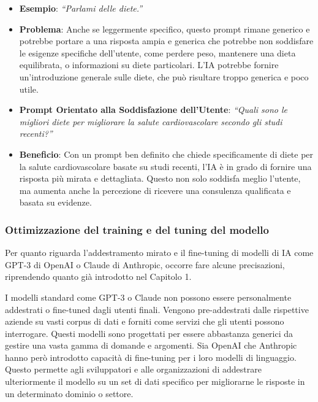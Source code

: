             \begin{itemize}
                \item \textbf{Esempio}: \textit{``Parlami delle diete.''}
                \item \textbf{Problema}: Anche se leggermente specifico, questo prompt rimane generico e potrebbe portare a una risposta ampia e generica che potrebbe non soddisfare le esigenze specifiche dell'utente, come perdere peso, mantenere una dieta equilibrata, o informazioni su diete particolari. L'IA potrebbe fornire un'introduzione generale sulle diete, che può risultare troppo generica e poco utile.
                \item \textbf{Prompt Orientato alla Soddisfazione dell'Utente}: \textit{``Quali sono le migliori diete per migliorare la salute cardiovascolare secondo gli studi recenti?''}
                \item \textbf{Beneficio}: Con un prompt ben definito che chiede specificamente di diete per la salute cardiovascolare basate su studi recenti, l'IA è in grado di fornire una risposta più mirata e dettagliata. Questo non solo soddisfa meglio l'utente, ma aumenta anche la percezione di ricevere una consulenza qualificata e basata su evidenze.
            \end{itemize}
            
        \subsubsection{Ottimizzazione del training e del tuning del modello}
            Per quanto riguarda l'addestramento mirato e il fine-tuning di modelli di IA come GPT-3 di OpenAI o Claude di Anthropic, occorre fare alcune precisazioni, riprendendo quanto già introdotto nel Capitolo 1.

            I modelli standard come GPT-3 o Claude non possono essere personalmente addestrati o fine-tuned dagli utenti finali. Vengono pre-addestrati dalle rispettive aziende su vasti corpus di dati e forniti come servizi che gli utenti possono interrogare. Questi modelli sono progettati per essere abbastanza generici da gestire una vasta gamma di domande e argomenti. Sia OpenAI che Anthropic hanno però introdotto capacità di fine-tuning per i loro modelli di linguaggio. Questo permette agli sviluppatori e alle organizzazioni di addestrare ulteriormente il modello su un set di dati specifico per migliorarne le risposte in un determinato dominio o settore.
            
